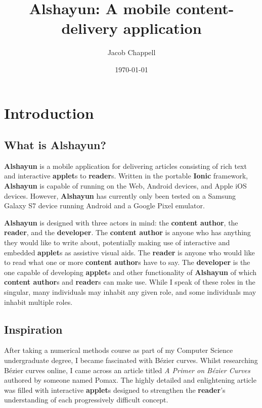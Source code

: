 \documentclass[12pt]{report}
\begin{document}
\title{Alshayun: A mobile content-delivery application}
\author{Jacob Chappell}
\date{\today}
\maketitle

\tableofcontents
\listoffigures


\chapter{Introduction}

    \section{What is Alshayun?}

\textbf{Alshayun} is a mobile application for delivering articles consisting of
rich text and interactive \textbf{applet}s to \textbf{reader}s. Written in the
portable \textbf{Ionic} framework, \textbf{Alshayun} is capable of running on
the Web, Android devices, and Apple iOS devices. However, \textbf{Alshayun} has
currently only been tested on a Samsung Galaxy S7 device running Android and a
Google Pixel emulator.

\textbf{Alshayun} is designed with three actors in mind: the \textbf{content
author}, the \textbf{reader}, and the \textbf{developer}. The \textbf{content
author} is anyone who has anything they would like to write about, potentially
making use of interactive and embedded \textbf{applet}s as assistive visual
aids. The \textbf{reader} is anyone who would like to read what one or more
\textbf{content author}s have to say. The \textbf{developer} is the one capable
of developing \textbf{applet}s and other functionality of \textbf{Alshayun} of
which \textbf{content author}s and \textbf{reader}s can make use. While I speak
of these roles in the singular, many individuals may inhabit any given role, and
some individuals may inhabit multiple roles.

    \section{Inspiration}

After taking a numerical methods course as part of my Computer Science
undergraduate degree, I became fascinated with Bézier curves. Whilst researching
Bézier curves online, I came across an article titled \textit{A Primer on Bézier
Curves} \cite{pomax} authored by someone named Pomax. The highly detailed and
enlightening article was filled with interactive \textbf{applet}s designed to
strengthen the \textbf{reader}'s understanding of each progressively difficult
concept.
\end{document}
